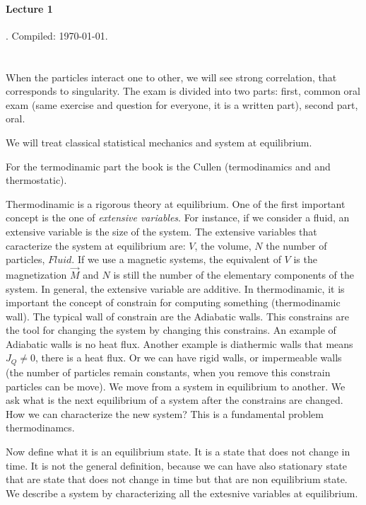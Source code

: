 \documentclass[../main/main.tex]{subfiles}
\begin{document}
\paragraph{Lecture 1}  . Compiled:  \today.

\section{}

When the particles interact one to other, we will see strong correlation, that corresponds to singularity. The exam is divided into two parts: first, common oral exam (same exercise and question for everyone, it is a written part), second part, oral. 

We will treat classical statistical mechanics and system at equilibrium. 

For the termodinamic part the book is the Cullen (termodinamics and and thermostatic).

Thermodinamic is a rigorous theory at equilibrium. 
One of the first important concept is the one of \textit{extensive variables}. For instance, if we consider a fluid, an extensive variable is the size of the system.
The extensive variables that caracterize the system at equilibrium are: $V$, the volume, $N$ the number of particles, $Fluid$. If we use a magnetic systems, the equivalent of $V$ is the magnetization $\vec{M}$ and $N$ is still the number of the elementary components of the system.
In general, the extensive variable are additive. 
In thermodinamic, it is important the concept of constrain for computing something (thermodinamic wall). The typical wall of constrain are the Adiabatic walls. This constrains are the tool for changing the system by changing this constrains.
An example of Adiabatic walls is no heat flux. Another example is diathermic walls that means $J_Q \neq 0$, there is a heat flux. 
Or we can have rigid walls, or impermeable walls (the number of particles remain constants, when you remove this constrain particles can be move). 
We move from a system in equilibrium to another. We ask what is the next equilibrium of a system after the constrains are changed. How we can characterize the new system? This is a fundamental problem thermodinamcs. 

Now define what it is an equilibrium state. It is a state that does not change in time. It is not the general definition, because we can have also stationary state that are state that does not change in time but that are non equilibrium state.
We describe a system by characterizing all the extesnive variables at equilibrium. 
\end{document}
